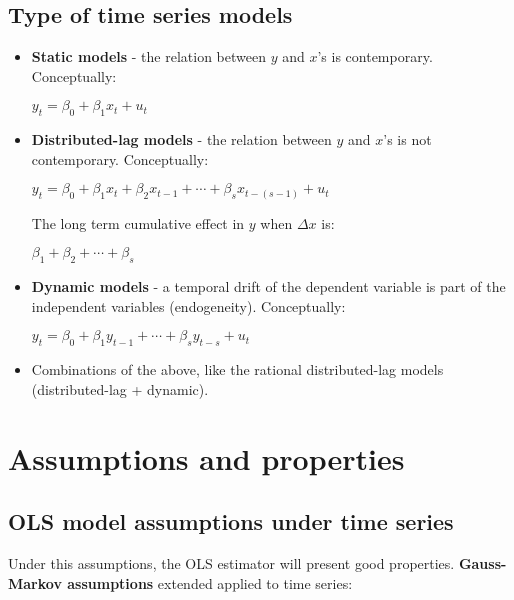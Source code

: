 \documentclass[10pt, a4paper, landscape]{extarticle}
\begin{document}
\begin{multicols}{3}
\subsection*{Type of time series models}

\begin{itemize}[leftmargin=*]
	\item \textbf{Static models} - the relation between $y$ and $x$'s is contemporary. Conceptually:
	\begin{center}
		$y_t = \beta_0 + \beta_1 x_t + u_t$
	\end{center}
	\item \textbf{Distributed-lag models} - the relation between $y$ and $x$'s is not contemporary. Conceptually:
	\begin{center}
		$y_t = \beta_0 + \beta_1 x_t + \beta_2 x_{t - 1} + \cdots + \beta_{s} x_{t - (s - 1)} + u_t$
	\end{center}
	The long term cumulative effect in $y$ when $\Delta x$ is:
	\begin{center}
	 	$\beta_1 + \beta_2 + \cdots + \beta_{s}$
	\end{center}
 	\item \textbf{Dynamic models} - a temporal drift of the dependent variable is part of the independent variables (endogeneity). Conceptually:
 	\begin{center}
 		$y_t = \beta_0 + \beta_1 y_{t - 1} + \cdots + \beta_s y_{t - s} + u_t$
 	\end{center}
	\item Combinations of the above, like the rational distributed-lag models (distributed-lag + dynamic).
\end{itemize}

\columnbreak

\section*{Assumptions and properties}

\subsection*{OLS model assumptions under time series}

Under this assumptions, the OLS estimator will present good properties. \textbf{Gauss-Markov assumptions} extended applied to time series:


\end{multicols}
\end{document}
